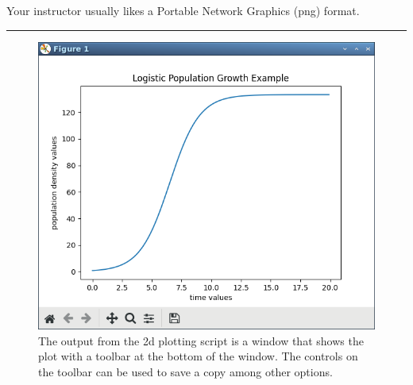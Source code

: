 \documentclass[10pt,fleqn]{article}
\begin{document}
Your instructor usually likes a Portable Network Graphics (png) format. 
\vskip0.1in\hrule\vskip0.1in
\vfill
\begin{figure}[h]
\centering
\includegraphics[width=6.0in]{../images/2dplot_06.png}
\caption{The output from the 2d plotting script is a window that shows the plot
         with a toolbar at the bottom of the window. The controls on the
         toolbar can be used to save a copy among other options.}
\end{figure}
\eject
\end{document}
